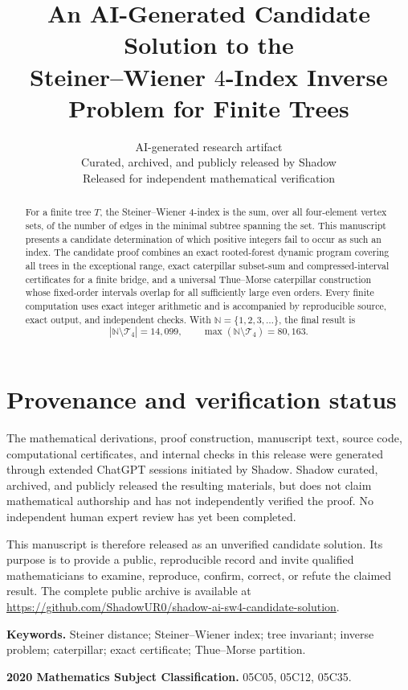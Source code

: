 \documentclass[11pt]{article}
\title{An AI-Generated Candidate Solution to the\\
Steiner--Wiener $4$-Index Inverse Problem for Finite Trees}
\author{AI-generated research artifact\\
\small Curated, archived, and publicly released by Shadow\\
\small Released for independent mathematical verification}
\date{}
\theoremstyle{definition}
\theoremstyle{remark}
\newcommand{\Tfour}{\mathcal T_4}
\newcommand{\N}{\mathbb N}
\begin{document}
\maketitle

\begin{abstract}
For a finite tree $T$, the Steiner--Wiener $4$-index is the sum, over all
four-element vertex sets, of the number of edges in the minimal subtree
spanning the set.  This manuscript presents a candidate determination of which positive integers fail to occur
as such an index.  The candidate proof combines an exact rooted-forest dynamic program
covering all trees in the exceptional range, exact caterpillar subset-sum and
compressed-interval certificates for a finite bridge, and a universal
Thue--Morse caterpillar construction whose fixed-order intervals overlap for
all sufficiently large even orders.  Every finite computation uses exact
integer arithmetic and is accompanied by reproducible source, exact output,
and independent checks.  With $\N=\{1,2,3,\ldots\}$, the final result is
\[
  \left|\N\setminus\Tfour\right|=14{,}099,
  \qquad
  \max(\N\setminus\Tfour)=80{,}163.
\]
\end{abstract}

\section*{Provenance and verification status}

The mathematical derivations, proof construction, manuscript text, source
code, computational certificates, and internal checks in this release were
generated through extended ChatGPT sessions initiated by Shadow.  Shadow
curated, archived, and publicly released the resulting materials, but does not
claim mathematical authorship and has not independently verified the proof.
No independent human expert review has yet been completed.

This manuscript is therefore released as an unverified candidate solution.
Its purpose is to provide a public, reproducible record and invite qualified
mathematicians to examine, reproduce, confirm, correct, or refute the claimed
result.  The complete public archive is available at
\url{https://github.com/ShadowUR0/shadow-ai-sw4-candidate-solution}.

\noindent\textbf{Keywords.}
Steiner distance; Steiner--Wiener index; tree invariant; inverse problem;
caterpillar; exact certificate; Thue--Morse partition.

\noindent\textbf{2020 Mathematics Subject Classification.}
05C05, 05C12, 05C35.
\end{document}
